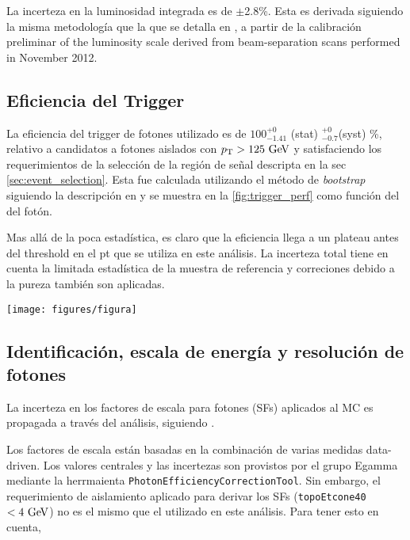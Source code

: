 La incerteza en la luminosidad integrada es de $\pm$2.8\%. %
Esta es derivada siguiendo la misma metodología que la que se detalla en \cite{lumi2011},
a partir de la calibración preliminar of the luminosity scale derived from beam-separation
scans performed in November 2012.


\subsection{Eficiencia del Trigger}\label{sec:trigger_eff}

La eficiencia del trigger de fotones utilizado {\trigchain} es de $100^{+0}_{-1.41}$ (stat) ${}^{+0}_{-0.7}$(syst) \%,
relativo a candidatos a fotones aislados con $\pt > 125 \gev$ y satisfaciendo los requerimientos
de la selección de la región de señal descripta en la sec \ref{sec:event_selection}.
Esta fue calculada utilizando el método de \emph{bootstrap} siguiendo la descripción en \cite{Damazio:1609629}
y se muestra en la {\fig} \ref{fig:trigger_perf} como función del {\pt} del fotón.

Mas allá de la poca estadística, es claro que la eficiencia llega a un plateau antes del threshold
en el pt que se utiliza en este análisis. La incerteza total tiene en cuenta la limitada estadística de
la muestra de referencia y correciones debido a la pureza también son aplicadas.

\begin{figure*}[ht!]
  \centering
  \texttt{[image: figures/figura]}
  \caption{Eficiencia del trigger para {\trigchain} como funcion del {\pt} del fotón,
    medida a partir de los datos.}
  \label{fig:trigger_perf}
\end{figure*}

\subsection{Identificación, escala de energía y resolución de fotones}\label{sec:syst_photonid}

La incerteza en los factores de escala para fotones (SFs) aplicados al MC es propagada
a través del análisis, siguiendo \cite{PhoEffTwiki}. %

Los factores de escala están basadas en la combinación de varias medidas data-driven.
Los valores centrales y las incertezas son provistos por el grupo Egamma mediante la herrmaienta
\texttt{PhotonEfficiencyCorrectionTool}. %
Sin embargo, el requerimiento de aislamiento aplicado para derivar los SFs
(\texttt{topoEtcone40} $< 4\gev$) no es el mismo que el utilizado en este análisis. Para tener esto
en cuenta,

